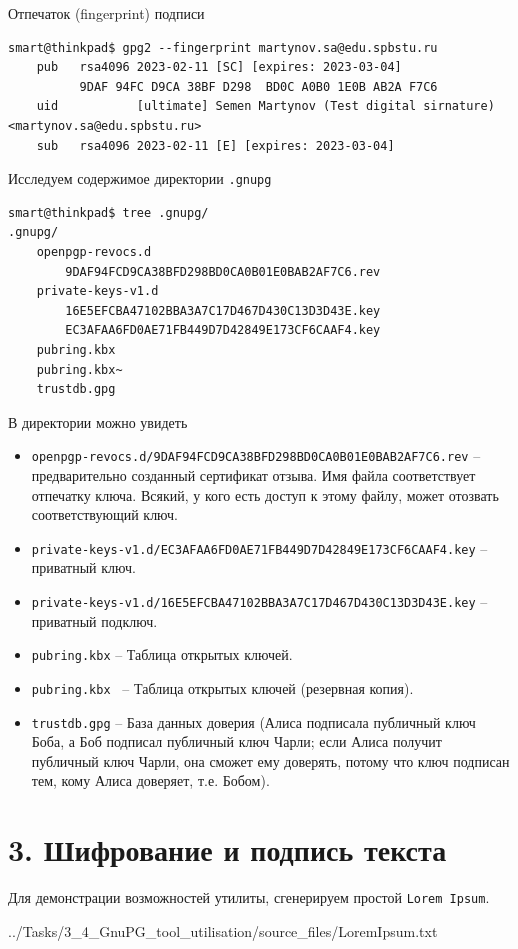 Отпечаток (fingerprint) подписи
\begin{Verbatim}[frame=single,breaklines=true,breakanywhere=true]
    smart@thinkpad$ gpg2 --fingerprint martynov.sa@edu.spbstu.ru
    pub   rsa4096 2023-02-11 [SC] [expires: 2023-03-04]
          9DAF 94FC D9CA 38BF D298  BD0C A0B0 1E0B AB2A F7C6
    uid           [ultimate] Semen Martynov (Test digital sirnature) <martynov.sa@edu.spbstu.ru>
    sub   rsa4096 2023-02-11 [E] [expires: 2023-03-04]
\end{Verbatim}

Исследуем содержимое директории \texttt{.gnupg}
\begin{Verbatim}[frame=single,breaklines=true,breakanywhere=true]
smart@thinkpad$ tree .gnupg/
.gnupg/
    openpgp-revocs.d
        9DAF94FCD9CA38BFD298BD0CA0B01E0BAB2AF7C6.rev
    private-keys-v1.d
        16E5EFCBA47102BBA3A7C17D467D430C13D3D43E.key
        EC3AFAA6FD0AE71FB449D7D42849E173CF6CAAF4.key
    pubring.kbx
    pubring.kbx~
    trustdb.gpg
\end{Verbatim}

В директории можно увидеть
\begin{itemize}
    \item \texttt{openpgp-revocs.d/9DAF94FCD9CA38BFD298BD0CA0B01E0BAB2AF7C6.rev} --  предварительно созданный сертификат отзыва. Имя файла соответствует отпечатку ключа. Всякий, у кого есть доступ к этому файлу, может отозвать соответствующий ключ.
    \item \texttt{private-keys-v1.d/EC3AFAA6FD0AE71FB449D7D42849E173CF6CAAF4.key} -- приватный ключ.
    \item \texttt{private-keys-v1.d/16E5EFCBA47102BBA3A7C17D467D430C13D3D43E.key} -- приватный подключ.
    \item \texttt{pubring.kbx} -- Таблица открытых ключей.
    \item \texttt{pubring.kbx~} -- Таблица открытых ключей (резервная копия).
    \item \texttt{trustdb.gpg} -- База данных доверия (Алиса подписала публичный ключ Боба, а Боб подписал публичный ключ Чарли; если Алиса получит публичный ключ Чарли, она сможет ему доверять, потому что ключ подписан тем, кому Алиса доверяет, т.е. Бобом).
\end{itemize}

\section*{3. Шифрование и подпись текста}
Для демонстрации возможностей утилиты, сгенерируем простой \texttt{Lorem Ipsum}.

{../Tasks/3_4_GnuPG_tool_utilisation/source_files/LoremIpsum.txt}

